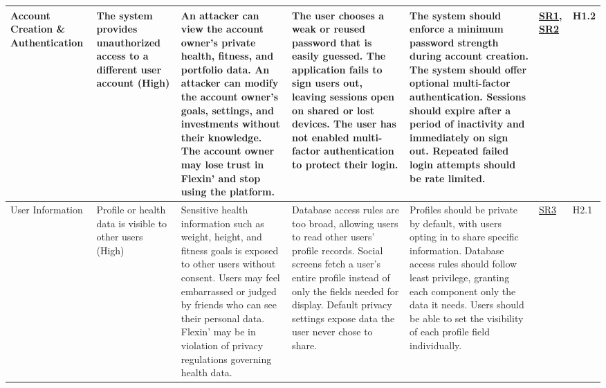 \documentclass{article}
\begin{document}
\begin{landscape}
{\begin{longtable}{|p{2.5cm}|p{3cm}|p{3.8cm}|p{3.8cm}|p{5.5cm}|p{1.8cm}|p{1cm}|}
            Account Creation \& Authentication & The system provides unauthorized access to a different user account (High) & \textbullet{} An attacker can view the account owner's private health, fitness, and portfolio data. \newline \textbullet{} An attacker can modify the account owner's goals, settings, and investments without their knowledge. \newline \textbullet{} The account owner may lose trust in Flexin' and stop using the platform. & \textbullet{} The user chooses a weak or reused password that is easily guessed. \newline \textbullet{} The application fails to sign users out, leaving sessions open on shared or lost devices. \newline \textbullet{} The user has not enabled multi-factor authentication to protect their login. & \textbullet{} The system should enforce a minimum password strength during account creation. \newline \textbullet{} The system should offer optional multi-factor authentication. \newline \textbullet{} Sessions should expire after a period of inactivity and immediately on sign out. \newline \textbullet{} Repeated failed login attempts should be rate limited. & \hyperlink{sr1}{SR1}, \hyperlink{sr2}{SR2} & H1.2 \\
            \hline
            User Information & Profile or health data is visible to other users (High) & \textbullet{} Sensitive health information such as weight, height, and fitness goals is exposed to other users without consent. \newline \textbullet{} Users may feel embarrassed or judged by friends who can see their personal data. \newline \textbullet{} Flexin' may be in violation of privacy regulations governing health data. & \textbullet{} Database access rules are too broad, allowing users to read other users' profile records. \newline \textbullet{} Social screens fetch a user's entire profile instead of only the fields needed for display. \newline \textbullet{} Default privacy settings expose data the user never chose to share. & \textbullet{} Profiles should be private by default, with users opting in to share specific information. \newline \textbullet{} Database access rules should follow least privilege, granting each component only the data it needs. \newline \textbullet{} Users should be able to set the visibility of each profile field individually. & \hyperlink{sr3}{SR3} & H2.1 \\

\end{longtable}}
\end{landscape}
\end{document}
